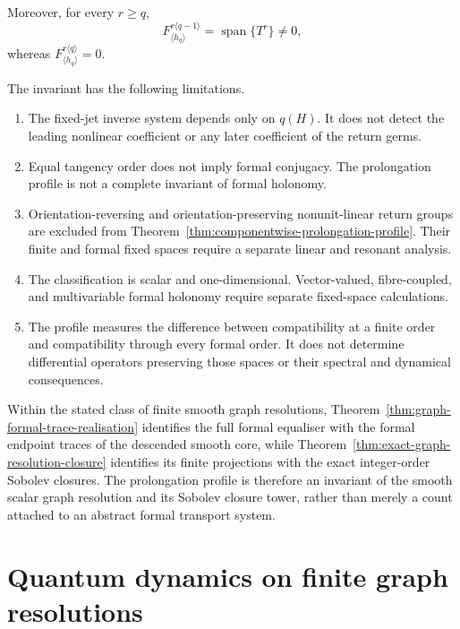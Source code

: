 \documentclass[11pt]{article}
\theoremstyle{plain}
\theoremstyle{definition}
\begin{document}
Moreover, for every
\(r\geq q\),
\[
  F_{\langle h_q\rangle}^{r\langle q-1\rangle}
  =
  \operatorname{span}\{T^r\}
  \neq0,
\]
whereas
\(F_{\langle h_q\rangle}^{r\langle q\rangle}=0\).


The invariant has the following limitations.

\begin{enumerate}[label=\textup{(\roman*)}]
  \item The fixed-jet inverse system depends only on \(q(H)\). It does
        not detect the leading nonlinear coefficient or any later
        coefficient of the return germs.

  \item Equal tangency order does not imply formal conjugacy. The
        prolongation profile is not a complete invariant of formal
        holonomy.

  \item Orientation-reversing and orientation-preserving
        nonunit-linear return groups are excluded from
        Theorem~\ref{thm:componentwise-prolongation-profile}. Their
        finite and formal fixed spaces require a separate linear and
        resonant analysis.

  \item The classification is scalar and one-dimensional.
        Vector-valued, fibre-coupled, and multivariable formal
        holonomy require separate fixed-space calculations.

  \item The profile measures the difference between compatibility at
        a finite order and compatibility through every formal order.
        It does not determine differential operators preserving those
        spaces or their spectral and dynamical consequences.
\end{enumerate}

Within the stated class of finite smooth graph resolutions,
Theorem~\ref{thm:graph-formal-trace-realisation}
identifies the full formal equaliser with the formal endpoint traces of
the descended smooth core, while
Theorem~\ref{thm:exact-graph-resolution-closure}
identifies its finite projections with the exact integer-order
Sobolev closures. The prolongation profile is therefore an invariant
of the smooth scalar graph resolution and its Sobolev closure tower, rather
than merely a count attached to an abstract formal transport system.

\clearpage
\part{Quantum dynamics on finite graph resolutions}
\label{part:quantum-dynamics}
\end{document}
